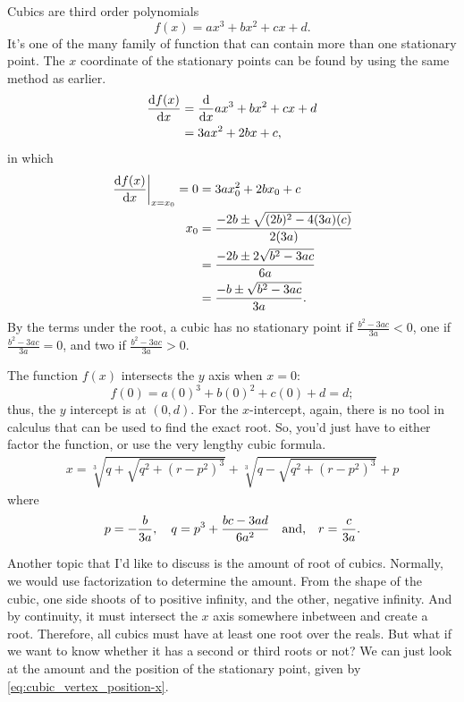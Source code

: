 Cubics are third order polynomials
\begin{equation}
	f(x) = ax^3 + bx^2 + cx + d.
\end{equation}
It's one of the many family of function that can contain more than one stationary point. The $x$ coordinate of the stationary points can be found by using the same method as earlier.
\begin{align}
	\odv{f(x)}{x} &= \odv*{ax^3 + bx^2 + cx + d}{x} \\
				  &= 3ax^2 + 2bx + c,
\end{align}
in which
\begin{align}
	\odv{f(x)}{x}_{x = x_0} = 0 &= 3ax_0^2 + 2bx_0 + c \\
	x_0 &= \frac{- 2b \pm \sqrt{(2b)^2 - 4(3a)(c)}}{2(3a)} \\
		&= \frac{- 2b \pm 2\sqrt{b^2 - 3ac}}{6a} \\
		&= \frac{- b \pm \sqrt{b^2 - 3ac}}{3a}. \label{eq:cubic_vertex_position-x}
\end{align}
By the terms under the root, a cubic has no stationary point if $\frac{b^2 - 3ac}{3a} < 0$, one if $\frac{b^2 - 3ac}{3a} = 0$, and two if $\frac{b^2 - 3ac}{3a} > 0$.

The function $f(x)$ intersects the $y$ axis when $x = 0$:
\begin{equation}
	f(0) = a(0)^3 + b(0)^2 + c(0) + d = d;
\end{equation}
thus, the $y$ intercept is at $(0, d)$. For the $x$-intercept, again, there is no tool in calculus that can be used to find the exact root. So, you'd just have to either factor the function, or use the very lengthy cubic formula.
\begin{equation}
	\begin{gathered}
		x = \sqrt[3]{q + \sqrt{q^2 + (r - p^2)^3}} + \sqrt[3]{q - \sqrt{q^2 + (r - p^2)^3}} + p
	\end{gathered}
\end{equation}
where
\begin{equation}
	p = -\frac{b}{3a}, \quad q = p^3 + \frac{bc - 3ad}{6a^2} \quad\textrm{and,}\quad r = \frac{c}{3a}.
\end{equation}


Another topic that I'd like to discuss is the amount of root of cubics. Normally, we would use factorization to determine the amount. From the shape of the cubic, one side shoots of to positive infinity, and the other, negative infinity. And by continuity, it must intersect the $x$ axis somewhere inbetween and create a root. Therefore, all cubics must have at least one root over the reals. But what if we want to know whether it has a second or third roots or not? We can just look at the amount and the position of the stationary point, given by \cref{eq:cubic_vertex_position-x}.


